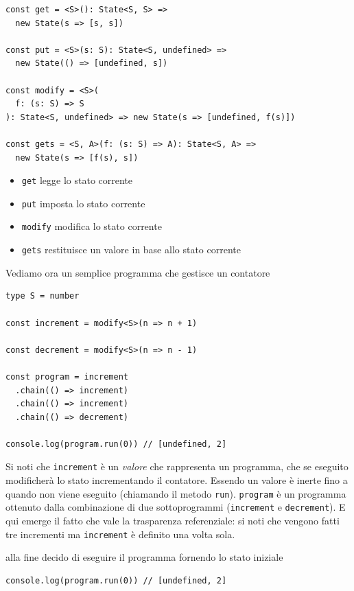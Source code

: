 \documentclass[12pt]{article}
\begin{document}
\begin{verbatim}
const get = <S>(): State<S, S> =>
  new State(s => [s, s])

const put = <S>(s: S): State<S, undefined> =>
  new State(() => [undefined, s])

const modify = <S>(
  f: (s: S) => S
): State<S, undefined> => new State(s => [undefined, f(s)])

const gets = <S, A>(f: (s: S) => A): State<S, A> =>
  new State(s => [f(s), s])
\end{verbatim}

\begin{itemize}
  \item \texttt{get} legge lo stato corrente
  \item \texttt{put} imposta lo stato corrente
  \item \texttt{modify} modifica lo stato corrente
  \item \texttt{gets} restituisce un valore in base allo stato corrente
\end{itemize}

Vediamo ora un semplice programma che gestisce un contatore

\begin{verbatim}
type S = number

const increment = modify<S>(n => n + 1)

const decrement = modify<S>(n => n - 1)

const program = increment
  .chain(() => increment)
  .chain(() => increment)
  .chain(() => decrement)

console.log(program.run(0)) // [undefined, 2]
\end{verbatim}

Si noti che \texttt{increment} è un \emph{valore} che rappresenta un programma, che se eseguito
modificherà lo stato incrementando il contatore.
Essendo un valore è inerte fino a quando non viene eseguito (chiamando il metodo \texttt{run}).
\texttt{program} è un programma ottenuto dalla combinazione di due sottoprogrammi (\texttt{increment} e \texttt{decrement}).
E qui emerge il fatto che vale la trasparenza referenziale: si noti che vengono fatti tre incrementi
ma \texttt{increment} è definito una volta sola.

alla fine decido di eseguire il programma fornendo lo stato iniziale

\begin{verbatim}
console.log(program.run(0)) // [undefined, 2]
\end{verbatim}
\end{document}
